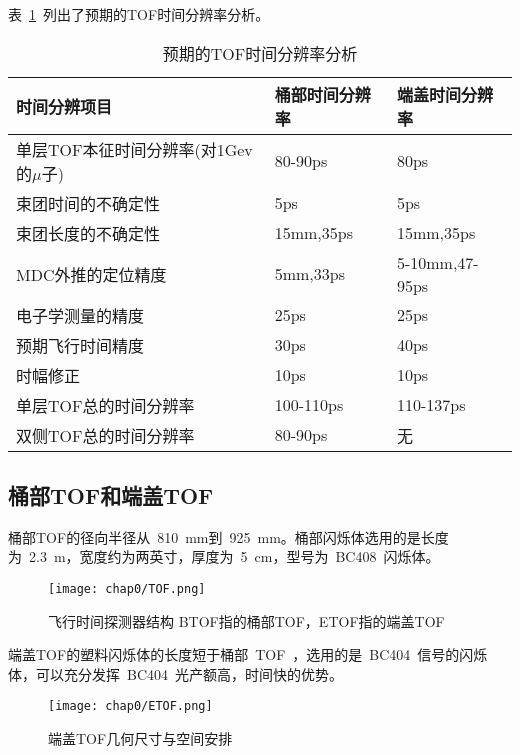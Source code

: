 表~\ref{tbl:TOF-expect-sigma}~列出了预期的TOF时间分辨率分析。
\begin{table}[h]
    \centering
    \caption{\label{tbl:TOF-expect-sigma} 预期的TOF时间分辨率分析}
    \footnotesize
    \begin{tabular}{lll}
        \hline
        时间分辨项目& 桶部时间分辨率& 端盖时间分辨率 \\
        \hline
        单层TOF本征时间分辨率(对1Gev的$\mu$子)& 80-90ps&        80ps \\
        束团时间的不确定性&                     5ps&            5ps \\
        束团长度的不确定性&                     15mm,35ps&      15mm,35ps\\
        MDC外推的定位精度&                      5mm,33ps&       5-10mm,47-95ps\\
        电子学测量的精度&                       25ps&           25ps\\
        预期飞行时间精度&                       30ps&           40ps\\
        时幅修正&                               10ps&          10ps  \\
		单层TOF总的时间分辨率&                   100-110ps&     110-137ps           \\
		双侧TOF总的时间分辨率&                   80-90ps&       无                \\       
        \hline
    \end{tabular}
\end{table}

\subsection{桶部TOF和端盖TOF}
桶部TOF的径向半径从~810~mm到~925~mm。桶部闪烁体选用的是长度为~2.3~m，宽度约为两英寸，厚度为~5~cm，型号为~BC408~闪烁体。
\begin{figure}[!h]
  \centering
  \texttt{[image: chap0/TOF.png]}
  \caption{飞行时间探测器结构 BTOF指的桶部TOF，ETOF指的端盖TOF}
  \label{fig:TOF}
\end{figure}

端盖TOF的塑料闪烁体的长度短于桶部~TOF~，选用的是~BC404~信号的闪烁体，可以充分发挥~BC404~光产额高，时间快的优势。
\begin{figure}[!h]
  \centering
  \texttt{[image: chap0/ETOF.png]}
  \caption{端盖TOF几何尺寸与空间安排}
  \label{fig:ETOF}
\end{figure}
